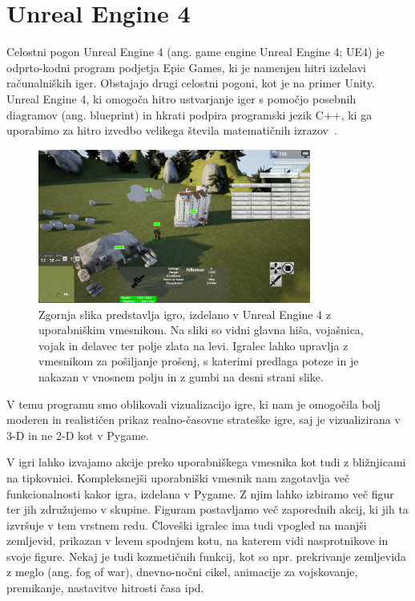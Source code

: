 \documentclass[a4paper, 12pt]{book}
\begin{document}
{\section{Unreal Engine 4}
\label{UnrealEngine}

Celostni pogon Unreal Engine 4 (ang. game engine Unreal Engine 4; UE4) je odprto-kodni program podjetja Epic Games, ki je namenjen hitri izdelavi računalniških iger. 
Obstajajo drugi celostni pogoni, kot je na primer Unity.\\
Unreal Engine 4, ki omogoča hitro ustvarjanje iger s pomočjo posebnih diagramov (ang. blueprint) in hkrati podpira programski jezik C++, ki ga uporabimo za hitro izvedbo velikega števila matematičnih izrazov~\cite{diploma2}.

\begin{figure}[h!]
	\begin{center}
		\includegraphics[width=0.8\textwidth]{photos/ue4-widget.pdf}
	\end{center}
	\caption{Zgornja slika predstavlja igro, izdelano v Unreal Engine 4 z uporabniškim vmesnikom. 
		Na sliki so vidni glavna hiša, vojašnica, vojak in delavec ter polje zlata na levi. 
		Igralec lahko upravlja z vmesnikom za pošiljanje prošenj, s katerimi predlaga poteze in je nakazan v vnosnem polju in z gumbi na desni strani slike.}
	\label{ue4-game}
\end{figure}

V temu programu smo oblikovali vizualizacijo igre, ki nam je omogočila bolj moderen in realističen prikaz realno-časovne strateške igre, saj je vizualizirana v 3-D in ne 2-D kot v Pygame.

V igri lahko izvajamo akcije preko uporabniškega vmesnika kot tudi z bližnjicami na tipkovnici.
Kompleksnejši uporabniški vmesnik nam zagotavlja več funkcionalnosti kakor igra, izdelana v Pygame.
Z njim lahko izbiramo več figur ter jih združujemo v skupine.
Figuram postavljamo več zaporednih akcij, ki jih ta izvršuje v tem vrstnem redu.
Človeški igralec ima tudi vpogled na manjši zemljevid, prikazan v levem spodnjem kotu, na katerem vidi nasprotnikove in svoje figure.
Nekaj je tudi kozmetičnih funkcij, kot so npr. prekrivanje zemljevida z meglo (ang. fog of war), dnevno-nočni cikel, animacije za vojskovanje, premikanje, nastavitve hitrosti časa ipd.

}
\end{document}
